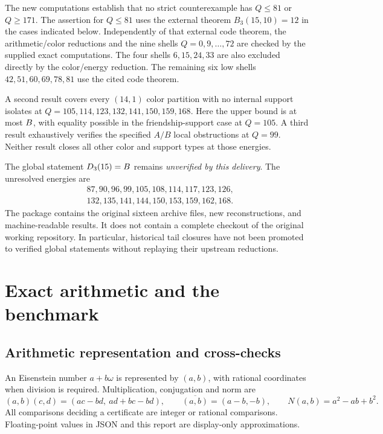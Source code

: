 \documentclass[11pt,a4paper]{article}
\begin{document}
The new computations establish that no strict counterexample has $Q\le81$ or $Q\ge171$. The assertion for $Q\le81$ uses the external theorem $B_3(15,10)=12$ in the cases indicated below. Independently of that external code theorem, the arithmetic/color reductions and the nine shells $Q=0,9,\ldots,72$ are checked by the supplied exact computations. The four shells $6,15,24,33$ are also excluded directly by the color/energy reduction. The remaining six low shells $42,51,60,69,78,81$ use the cited code theorem.

A second result covers every $(14,1)$ color partition with no internal support isolates at $Q=105,114,123,132,141,150,159,168$. Here the upper bound is at most $B$, with equality possible in the friendship-support case at $Q=105$. A third result exhaustively verifies the specified $A/B$ local obstructions at $Q=99$. Neither result closes all other color and support types at those energies.

The global statement $D_3(15)=B$ remains \emph{unverified by this delivery}. The unresolved energies are
\[
\begin{split}
&87,90,96,99,105,108,114,117,123,126,\\
&132,135,141,144,150,153,159,162,168.
\end{split}
\]
The package contains the original sixteen archive files, new reconstructions, and machine-readable results. It does not contain a complete checkout of the original working repository. In particular, historical tail closures have not been promoted to verified global statements without replaying their upstream reductions.

\section{Exact arithmetic and the benchmark}
\subsection{Arithmetic representation and cross-checks}
An Eisenstein number $a+b\omega$ is represented by $(a,b)$, with rational coordinates when division is required. Multiplication, conjugation and norm are
\[
(a,b)(c,d)=(ac-bd,\ ad+bc-bd),\qquad
\overline{(a,b)}=(a-b,-b),\qquad N(a,b)=a^2-ab+b^2.
\]
All comparisons deciding a certificate are integer or rational comparisons. Floating-point values in JSON and this report are display-only approximations.
\end{document}
